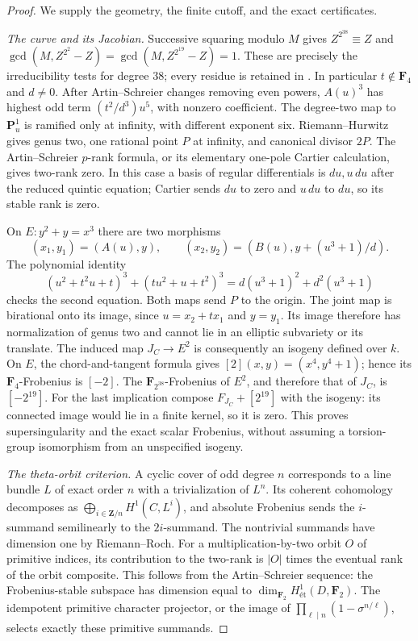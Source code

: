 \documentclass[11pt,a4paper]{article}
\newcommand{\et}{\text{ét}}
\begin{document}
\begin{proof}
We supply the geometry, the finite cutoff, and the exact certificates.

\emph{The curve and its Jacobian.}
Successive squaring modulo $M$ gives
$Z^{2^{38}}\equiv Z$ and
$\gcd(M,Z^{2^2}-Z)=\gcd(M,Z^{2^{19}}-Z)=1$.
These are precisely the irreducibility tests for degree 38; every
residue is retained in .
In particular $t\notin\mathbf F_4$ and $d\ne0$.
After Artin--Schreier changes removing even powers, $A(u)^3$ has
highest odd term $(t^2/d^3)u^5$, with nonzero coefficient.
The degree-two map to $\mathbf P^1_u$ is ramified only at infinity,
with different exponent six. Riemann--Hurwitz gives genus two,
one rational point $P$ at infinity, and canonical divisor $2P$.
The Artin--Schreier $p$-rank formula, or its elementary one-pole
Cartier calculation, gives two-rank zero. In this case a basis of
regular differentials is $du,u\,du$ after the reduced quintic
equation; Cartier sends $du$ to zero and $u\,du$ to $du$, so its
stable rank is zero.

On $E:y^2+y=x^3$ there are two morphisms
\[
 (x_1,y_1)=(A(u),y),\qquad
 (x_2,y_2)=(B(u),y+(u^3+1)/d).
\]
The polynomial identity
\[
 (u^2+t^2u+t)^3+(tu^2+u+t^2)^3
       =d(u^3+1)^2+d^2(u^3+1)
\]
checks the second equation. Both maps send $P$ to the origin.
The joint map is birational onto its image, since
$u=x_2+t x_1$ and $y=y_1$. Its image therefore has normalization
of genus two and cannot lie in an elliptic subvariety or its
translate. The induced map $J_C\to E^2$ is consequently an isogeny
defined over $k$. On $E$, the chord-and-tangent formula gives
$[2](x,y)=(x^4,y^4+1)$; hence its $\mathbf F_4$-Frobenius is $[-2]$.
The $\mathbf F_{2^{38}}$-Frobenius of $E^2$, and therefore that of
$J_C$, is $[-2^{19}]$. For the last implication compose
$F_{J_C}+[2^{19}]$ with the isogeny: its connected image would lie
in a finite kernel, so it is zero. This proves supersingularity
and the exact scalar Frobenius, without assuming a torsion-group
isomorphism from an unspecified isogeny.

\emph{The theta-orbit criterion.}
A cyclic cover of odd degree $n$ corresponds to a line bundle $L$
of exact order $n$ with a trivialization of $L^n$. Its coherent
cohomology decomposes as
$\bigoplus_{i\in\mathbf Z/n}H^1(C,L^i)$, and absolute Frobenius
sends the $i$-summand semilinearly to the $2i$-summand. The
nontrivial summands have dimension one by Riemann--Roch.
For a multiplication-by-two orbit $O$ of primitive indices, its
contribution to the two-rank is $|O|$ times the eventual rank of
the orbit composite. This follows from the Artin--Schreier
sequence: the Frobenius-stable subspace has dimension equal to
$\dim_{\mathbf F_2}H^1_{\et}(D,\mathbf F_2)$. The idempotent
primitive character projector, or the image of
$\prod_{\ell\mid n}(1-\sigma^{n/\ell})$, selects exactly these
primitive summands.


\end{proof}
\end{document}
